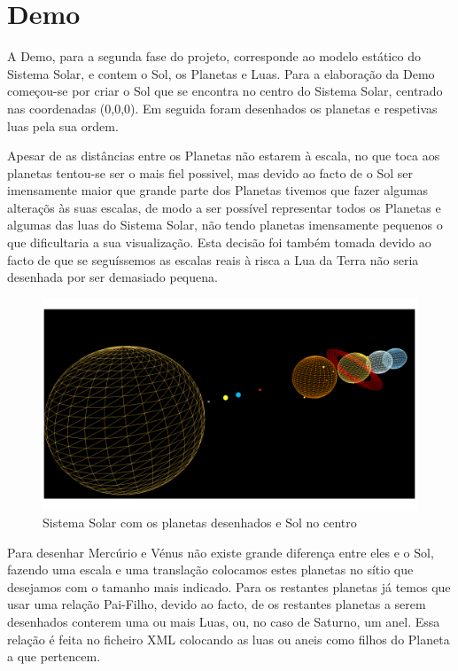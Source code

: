\chapter{Demo}

A Demo, para a segunda fase do projeto, corresponde ao modelo estático do Sistema Solar, e contem o Sol, os Planetas e Luas. Para a elaboração da Demo começou-se por criar o Sol que se encontra no centro do Sistema Solar, centrado nas coordenadas (0,0,0). Em seguida foram desenhados os planetas e respetivas luas pela sua  ordem.

Apesar de as distâncias entre os Planetas não estarem à escala, no que toca aos planetas tentou-se ser o mais fiel possivel, mas devido ao facto de o Sol ser imensamente maior que grande parte dos Planetas tivemos que fazer algumas alteraçõs às suas escalas, de modo a ser possível representar todos os Planetas e algumas das luas do Sistema Solar, não tendo planetas imensamente pequenos o que dificultaria a sua visualização. Esta decisão foi também tomada devido ao facto de que se seguíssemos as escalas reais à risca a Lua da Terra não seria desenhada por ser demasiado pequena.

\begin{figure}[htpb]
	\centering
	\includegraphics[scale=0.2445]{imagens/solarsystem.png}
	\caption{Sistema Solar com os planetas desenhados e Sol no centro}
	\label{p1:fig:p1_sistemasolar}
\end{figure}


Para desenhar Mercúrio e Vénus não existe grande diferença entre eles e o Sol, fazendo uma escala e uma translação colocamos estes planetas no sítio que desejamos com o tamanho mais indicado. Para os restantes planetas já temos que usar uma relação Pai-Filho, devido ao facto, de os restantes planetas a serem desenhados conterem uma ou mais Luas, ou, no caso de Saturno, um anel. Essa relação é feita no ficheiro XML colocando as luas ou aneis como filhos do Planeta a que pertencem. 




